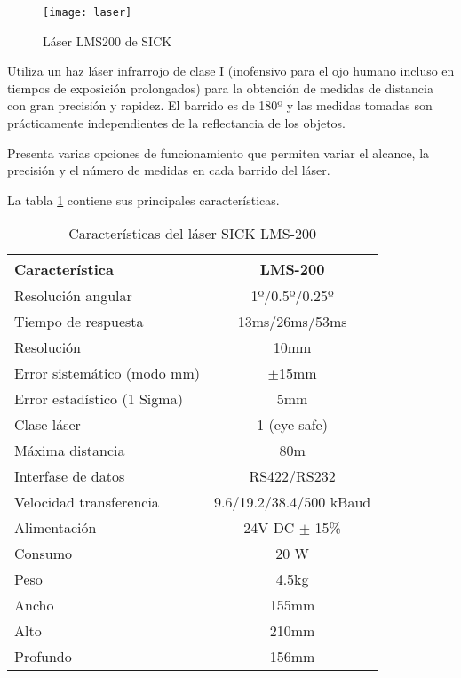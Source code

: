 \begin{figure}[h]
  \centering\texttt{[image: laser]}\\
  \caption{Láser LMS200 de SICK}\label{fg:laser}
\end{figure}

Utiliza un haz láser infrarrojo de clase I (inofensivo para el ojo humano incluso en tiempos de exposición prolongados) para la obtención de medidas de distancia con gran precisión y rapidez. El barrido es de 180º y las medidas tomadas son prácticamente independientes de la reflectancia de los objetos.

Presenta varias opciones de funcionamiento que permiten variar el alcance, la precisión y el número de medidas en cada barrido del láser.

La tabla \ref{tb:laser} contiene sus principales características.

\begin{table}[h]
\begin{center}
\caption{Características del láser SICK LMS-200}\label{tb:laser}

\vspace{5mm}

\begin{tabular}{|l|c|} \hline
Característica & LMS-200\\
\hline
\hline
Resolución angular & 1º/0.5º/0.25º\\
\hline
Tiempo de respuesta & 13ms/26ms/53ms\\
\hline
Resolución & 10mm\\
\hline
Error sistemático (modo mm) & $\pm$15mm\\
\hline
Error estadístico (1 Sigma) & 5mm\\
\hline
Clase láser & 1 (eye-safe)\\
\hline
\hline
Máxima distancia & 80m\\
\hline
Interfase de datos & RS422/RS232\\
\hline
Velocidad transferencia & 9.6/19.2/38.4/500 kBaud\\
\hline
Alimentación & 24V DC $\pm$ 15\%\\
\hline
\hline
Consumo & 20 W\\
\hline
Peso & 4.5kg\\
\hline
Ancho & 155mm\\
\hline
Alto & 210mm\\
\hline
Profundo & 156mm\\
\hline
\end{tabular}
\end{center}
\end{table}



